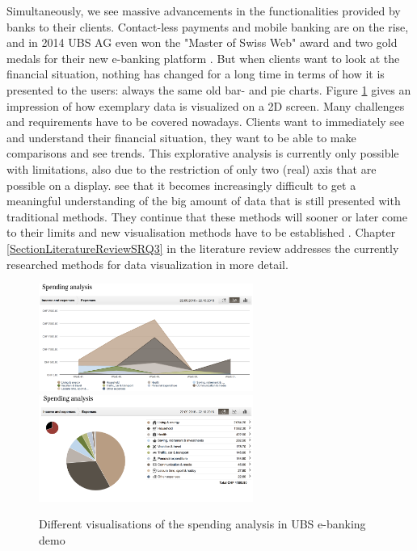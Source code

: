 Simultaneously, we see massive advancements in the functionalities provided by banks to their clients. Contact-less payments and mobile banking are on the rise, and in 2014 UBS AG even won the "Master of Swiss Web" award and two gold medals for their new e-banking platform \citep{UBSAG2014}. But when clients want to look at the financial situation, nothing has changed for a long time in terms of how it is presented to the users: always the same old bar- and pie charts. Figure \ref{fig:ubsspendinganalysis} gives an impression of how exemplary data is visualized on a 2D screen. Many challenges and requirements have to be covered nowadays. Clients want to immediately see and understand their financial situation, they want to be able to make comparisons and see trends. This explorative analysis is currently only possible with limitations, also due to the restriction of only two (real) axis that are possible on a display. \cite{Jamieson2007} see that it becomes increasingly difficult to get a meaningful understanding of the big amount of data that is still presented with traditional methods. They continue that these methods will sooner or later come to their limits and new visualisation methods have to be established \citep{Jamieson2007}. Chapter \ref{SectionLiteratureReviewSRQ3} in the literature review addresses the currently researched methods for data visualization in more detail.
\begin{figure}[h]
	\begin{center}
		\includegraphics[width=7cm]{03_Figures/06_Introduction/UBSAG2016_SpendingAnalysis2.png}
		\includegraphics[width=7cm]{03_Figures/06_Introduction/UBSAG2016_SpendingAnalysis.png}
		\caption[Different visualisations of the spending analysis in UBS e-banking demo]{Different visualisations of the spending analysis in UBS e-banking demo \citep{UBSAG2016}}
		\label{fig:ubsspendinganalysis}
	\end{center}
\end{figure}

